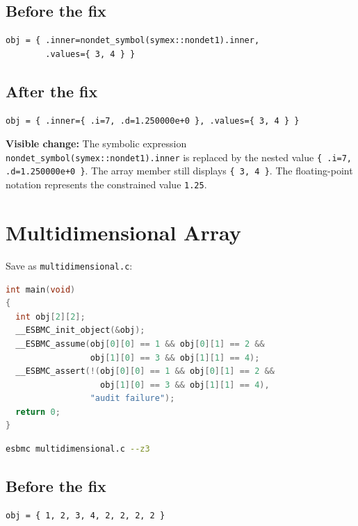 \documentclass[11pt]{article}
\begin{document}
\subsection*{Before the fix}

\begin{lstlisting}
obj = { .inner=nondet_symbol(symex::nondet1).inner,
        .values={ 3, 4 } }
\end{lstlisting}

\subsection*{After the fix}

\begin{lstlisting}
obj = { .inner={ .i=7, .d=1.250000e+0 }, .values={ 3, 4 } }
\end{lstlisting}

\noindent\textbf{Visible change:} The symbolic expression
\texttt{nondet\_symbol(symex::nondet1).inner} is replaced by the nested value
\texttt{\{ .i=7, .d=1.250000e+0 \}}. The array member still displays
\texttt{\{ 3, 4 \}}. The floating-point notation represents the constrained
value \texttt{1.25}.

\section{Multidimensional Array}

Save as \texttt{multidimensional.c}:

\begin{lstlisting}[language=C]
int main(void)
{
  int obj[2][2];
  __ESBMC_init_object(&obj);
  __ESBMC_assume(obj[0][0] == 1 && obj[0][1] == 2 &&
                 obj[1][0] == 3 && obj[1][1] == 4);
  __ESBMC_assert(!(obj[0][0] == 1 && obj[0][1] == 2 &&
                   obj[1][0] == 3 && obj[1][1] == 4),
                 "audit failure");
  return 0;
}
\end{lstlisting}

\begin{lstlisting}[language=bash]
esbmc multidimensional.c --z3
\end{lstlisting}

\subsection*{Before the fix}

\begin{lstlisting}
obj = { 1, 2, 3, 4, 2, 2, 2, 2 }
\end{lstlisting}
\end{document}
